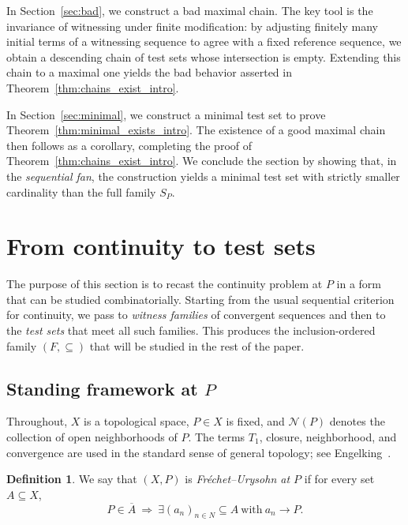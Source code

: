\documentclass[11pt]{amsart}
\theoremstyle{plain}
\theoremstyle{definition}
\newtheorem{definition}[theorem]{Definition}
\theoremstyle{remark}
\newcommand{\Sp}{\mathcal{S}_P}
\newcommand{\F}{\mathcal{F}}
\newcommand{\N}{\mathbb{N}}
\newcommand{\cl}[1]{\overline{#1}}
\def\Sp{S_P}%
\def\F{F}%
\def\N{N}%
\begin{document}
In Section~\ref{sec:bad}, we construct a bad maximal chain.
The key tool is the invariance of witnessing under finite modification:
by adjusting finitely many initial terms of a witnessing sequence to agree with a fixed reference sequence, we obtain a descending chain of test sets whose intersection is empty.
Extending this chain to a maximal one yields the bad behavior asserted in Theorem~\ref{thm:chains_exist_intro}.

In Section~\ref{sec:minimal}, we construct a minimal test set to prove Theorem~\ref{thm:minimal_exists_intro}.
The existence of a good maximal chain then follows as a corollary, completing the proof of Theorem~\ref{thm:chains_exist_intro}.
We conclude the section by showing that, in the \emph{sequential fan}, the construction yields a minimal test set with strictly smaller cardinality than the full family $\Sp$.

\section{From continuity to test sets}\label{sec:prelim}

The purpose of this section is to recast the continuity problem at $P$ in a form that can be studied combinatorially.
Starting from the usual sequential criterion for continuity, we pass to \emph{witness families} of convergent sequences and then to the \emph{test sets} that meet all such families.
This produces the inclusion-ordered family $(\F,\subseteq)$ that will be studied in the rest of the paper.

\subsection{Standing framework at \texorpdfstring{$P$}{P}}

Throughout, $X$ is a topological space, $P\in X$ is fixed, and $\mathcal N(P)$ denotes the collection of open neighborhoods of $P$.
The terms \(T_1\), closure, neighborhood, and convergence are used in the standard sense of general topology; see Engelking~\cite{Eng89}.

\begin{definition}\label{def:FU_at_P}
We say that $(X,P)$ is \emph{Fr\'echet--Urysohn at $P$} if for every set $A\subseteq X$,
\[
P\in\cl{A}\ \Longrightarrow\ \exists (a_n)_{n\in\N}\subseteq A\ \text{with}\ a_n\to P.
\]
\end{definition}
\end{document}
